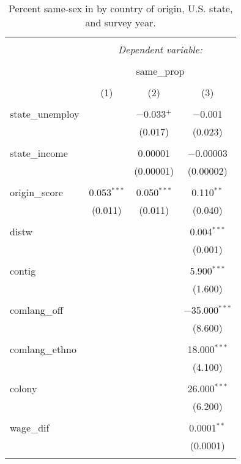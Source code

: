 \documentclass[
  11pt,
]{article}
\begin{document}
\begin{table}[!htbp] \centering 
  \caption{Percent same-sex in by country of origin, U.S. state, and survey year.} 
  \label{tab:state-props} 
\begin{tabular}{@{\extracolsep{5pt}}lccc} 
\\[-1.8ex]\hline 
\hline \\[-1.8ex] 
 & \multicolumn{3}{c}{\textit{Dependent variable:}} \\ 
\cline{2-4} 
\\[-1.8ex] & \multicolumn{3}{c}{same\_prop} \\ 
\\[-1.8ex] & (1) & (2) & (3)\\ 
\hline \\[-1.8ex] 
 state\_unemploy &  & $-$0.033$^{+}$ & $-$0.001 \\ 
  &  & (0.017) & (0.023) \\ 
  & & & \\ 
 state\_income &  & 0.00001 & $-$0.00003 \\ 
  &  & (0.00001) & (0.00002) \\ 
  & & & \\ 
 origin\_score & 0.053$^{***}$ & 0.050$^{***}$ & 0.110$^{**}$ \\ 
  & (0.011) & (0.011) & (0.040) \\ 
  & & & \\ 
 distw &  &  & 0.004$^{***}$ \\ 
  &  &  & (0.001) \\ 
  & & & \\ 
 contig &  &  & 5.900$^{***}$ \\ 
  &  &  & (1.600) \\ 
  & & & \\ 
 comlang\_off &  &  & $-$35.000$^{***}$ \\ 
  &  &  & (8.600) \\ 
  & & & \\ 
 comlang\_ethno &  &  & 18.000$^{***}$ \\ 
  &  &  & (4.100) \\ 
  & & & \\ 
 colony &  &  & 26.000$^{***}$ \\ 
  &  &  & (6.200) \\ 
  & & & \\ 
 wage\_dif &  &  & 0.0001$^{**}$ \\ 
  &  &  & (0.0001) \\ 
  & & & \\ 

\end{tabular}
\end{table}
\end{document}
